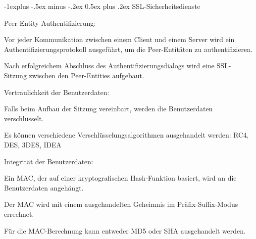 \documentclass[a4paper]{article}
\makeatletter
\renewcommand{\subsection}{\@startsection{subsection}{2}{0mm}%
 {-1explus -.5ex minus -.2ex}%
 {0.5ex plus .2ex}%
 {\normalfont\normalsize\bfseries}}
\makeatother
\begin{document}
\begin{multicols}{3}
\begin{itemize*}
            \subsection{SSL-Sicherheitsdienste}
            \begin{itemize*}
                  \item       Peer-Entity-Authentifizierung:
                  \begin{itemize*}
                        \item Vor jeder Kommunikation zwischen einem Client und einem Server wird ein Authentifizierungsprotokoll ausgeführt, um die Peer-Entitäten zu authentifizieren.
                        \item Nach erfolgreichem Abschluss des Authentifizierungsdialogs wird eine SSL-Sitzung zwischen den Peer-Entities aufgebaut.
                  \end{itemize*}
                  \item       Vertraulichkeit der Benutzerdaten:
                  \begin{itemize*}
                        \item Falls beim Aufbau der Sitzung vereinbart, werden die Benutzerdaten verschlüsselt.
                        \item Es können verschiedene Verschlüsselungsalgorithmen ausgehandelt werden: RC4, DES, 3DES, IDEA
                  \end{itemize*}
                  \item       Integrität der Benutzerdaten:
                  \begin{itemize*}
                        \item Ein MAC, der auf einer kryptografischen Hash-Funktion basiert, wird an die Benutzerdaten angehängt.
                        \item Der MAC wird mit einem ausgehandelten Geheimnis im Präfix-Suffix-Modus errechnet.
                        \item Für die MAC-Berechnung kann entweder MD5 oder SHA ausgehandelt werden.
                  \end{itemize*}
            \end{itemize*}


\end{itemize*}
\end{multicols}
\end{document}
